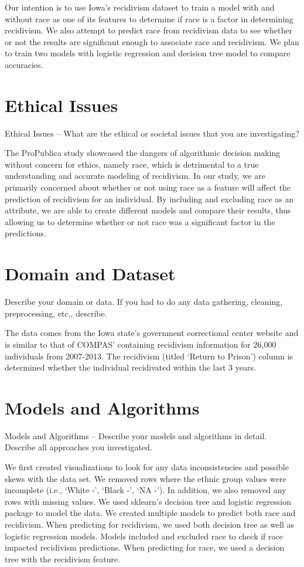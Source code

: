 \documentclass[10.5pt, twocolumn]{acmart}
\begin{document}
Our intention is to use Iowa’s recidivism dataset to train a model with and without race as one of its features to determine if race is a factor in determining recidivism. We also attempt to predict race from recidivism data to see whether or not the results are significant enough to associate race and recidivism. We  plan to train two models with logistic regression and decision tree model to compare accuracies.  

\section{Ethical Issues}
Ethical Issues – What are the ethical or societal issues that you are investigating?

The ProPublica study showcased the dangers of algorithmic decision making without concern for ethics, namely race, which is detrimental to a true understanding and accurate modeling of recidivism. In our study, we are primarily concerned about whether or not using race as a feature will affect the prediction of recidivism for an individual. By including and excluding race as an attribute, we are able to create different models and compare their results, thus allowing us to determine whether or not race was a significant factor in the predictions.

\section{Domain and Dataset}
Describe your domain or data. If you had to do any data gathering, cleaning, preprocessing, etc., describe.

The data comes from the Iowa state’s government correctional center website and is similar to that of COMPAS' containing recidivism information for 26,000 individuals from 2007-2013. The recidivism (titled ‘Return to Prison’) column is determined whether the individual recidivated within the last 3 years.

\section{Models and Algorithms}
Models and Algorithms – Describe your models and algorithms in detail. Describe all approaches you investigated. 

We first created visualizations to look for any data inconsistencies and possible skews with the data set. We removed rows where the ethnic group values were incomplete (i.e., ‘White -’, ‘Black -’, ‘NA -’). In addition, we also removed any rows with missing values. We used sklearn’s decision tree and logistic regression package to model the data. We created multiple models to predict both race and recidivism. When predicting for recidivism, we used both decision tree as well as logistic regression models. Models included and excluded race to check if race impacted recidivism predictions. When predicting for race, we used a decision tree with the recidivism feature.
\end{document}
